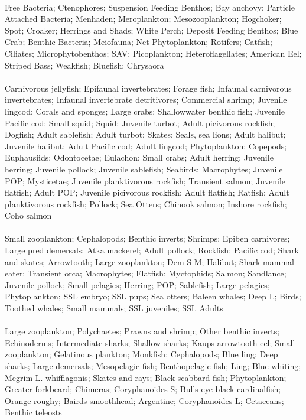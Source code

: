 \fullhline
\hline
{} \\
\hline
Free Bacteria; Ctenophores; Suspension Feeding Benthos; Bay anchovy; Particle Attached Bacteria; Menhaden; Meroplankton; Mesozooplankton; Hogchoker; Spot; Croaker; Herrings and Shads; White Perch; Deposit Feeding Benthos; Blue Crab; Benthic Bacteria; Meiofauna; Net Phytoplankton; Rotifers; Catfish; Ciliates; Microphytobenthos; SAV; Picoplankton; Heteroflagellates; American Eel; Striped Bass; Weakfish; Bluefish; Chrysaora\\
\fullhline
\hline
{} \\
\hline
Carnivorous jellyfish; Epifaunal invertebrates; Forage fish; Infaunal carnivorous invertebrates; Infaunal invertebrate detritivores; Commercial shrimp; Juvenile lingcod; Corals and sponges; Large crabs; Shallowwater benthic fish; Juvenile Pacific cod; Small squid; Squid; Juvenile turbot; Adult picivorous rockfish; Dogfish; Adult sablefish; Adult turbot; Skates; Seals, sea lions; Adult halibut; Juvenile halibut; Adult Pacific cod; Adult lingcod; Phytoplankton; Copepods; Euphausiids; Odontocetae; Eulachon; Small crabs; Adult herring; Juvenile herring; Juvenile pollock; Juvenile sablefish; Seabirds; Macrophytes; Juvenile POP; Mysticetae; Juvenile planktivorous rockfish; Transient salmon; Juvenile flatfish; Adult POP; Juvenile picivorous rockfish; Adult flatfish; Ratfish; Adult planktivorous rockfish; Pollock; Sea Otters; Chinook salmon; Inshore rockfish; Coho salmon\\
\fullhline
\hline
{} \\
\hline
Small zooplankton; Cephalopods; Benthic inverts; Shrimps; Epiben carnivores; Large pred demersals; Atka mackerel; Adult pollock; Rockfish; Pacific cod; Shark and skates; Arrowtooth; Large zooplankton; Dem S M; Halibut; Shark mammal eater; Transient orca; Macrophytes; Flatfish; Myctophids; Salmon; Sandlance; Juvenile pollock; Small pelagics; Herring; POP; Sablefish; Large pelagics; Phytoplankton; SSL embryo; SSL pups; Sea otters; Baleen whales; Deep L; Birds; Toothed whales; Small mammals; SSL juveniles; SSL Adults\\
\fullhline
\hline
{} \\
\hline
Large zooplankton; Polychaetes; Prawns and shrimp; Other benthic inverts; Echinoderms; Intermediate sharks; Shallow sharks; Kaups arrowtooth eel; Small zooplankton; Gelatinous plankton; Monkfish; Cephalopods; Blue ling; Deep sharks; Large demersals; Mesopelagic fish; Benthopelagic fish; Ling; Blue whiting; Megrim L. whiffiagonis; Skates and rays; Black scabbard fish; Phytoplankton; Greater forkbeard; Chimeras; Coryphanoides S; Bulls eye black cardinalfish; Orange roughy; Bairds smoothhead; Argentine; Coryphanoides L; Cetaceans; Benthic teleosts\\
